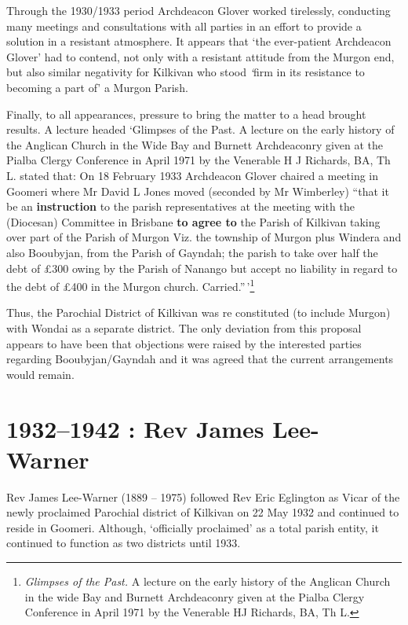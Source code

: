 Through the 1930/1933 period Archdeacon Glover worked tirelessly,
conducting many meetings and consultations with all parties in an effort
to provide a solution in a resistant atmosphere. It appears that `the
ever-patient Archdeacon Glover' had to contend, not only with a
resistant attitude from the Murgon end, but also similar negativity for
Kilkivan who stood \emph{`}firm in its resistance to becoming a part of'
a Murgon Parish.

Finally, to all appearances, pressure to bring the matter to a head
brought results. A lecture headed `Glimpses of the Past. A lecture on
the early history of the Anglican Church in the Wide Bay and Burnett
Archdeaconry given at the Pialba Clergy Conference in April 1971 by the
Venerable H J Richards, BA, Th L. stated that: On 18 February 1933
Archdeacon Glover chaired a meeting in Goomeri where Mr David L Jones
moved (seconded by Mr Wimberley) ``that it be an \textbf{instruction} to
the parish representatives at the meeting with the (Diocesan) Committee
in Brisbane \textbf{to agree to} the Parish of Kilkivan taking over part
of the Parish of Murgon Viz. the township of Murgon plus Windera and
also Booubyjan, from the Parish of Gayndah; the parish to take over half
the debt of \pounds300 owing by the Parish of Nanango but accept no liability
in regard to the debt of \pounds400 in the Murgon church.
Carried.''\,'\footnote{\emph{Glimpses of the Past.} A lecture on the
  early history of the Anglican Church in the wide Bay and Burnett
  Archdeaconry given at the Pialba Clergy Conference in April 1971 by
  the Venerable HJ Richards, BA, Th L.}

Thus, the Parochial District of Kilkivan was re constituted (to include
Murgon) with Wondai as a separate district. The only deviation from this
proposal appears to have been that objections were raised by the
interested parties regarding Booubyjan/Gayndah and it was agreed that
the current arrangements would remain.

\printendnotes
\setcounter{endnote}{0}
\chapter{1932--1942 : Rev James Lee-Warner}

Rev James Lee-Warner (1889 -- 1975) followed Rev Eric Eglington as Vicar
of the newly proclaimed Parochial district of Kilkivan on 22 May 1932
and continued to reside in Goomeri. Although, `officially proclaimed' as
a total parish entity, it continued to function as two districts until
1933.

